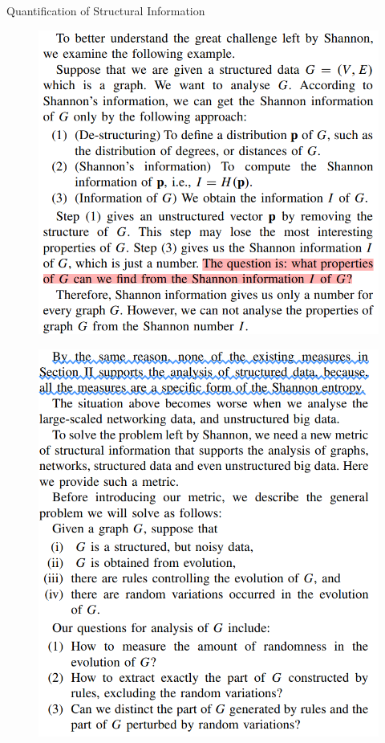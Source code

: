 \documentclass[t,aspectratio=169,usepdftitle=false]{beamer}
\begin{document}
  \begin{frame}{Quantification of Structural Information}
    \begin{minipage}[c]{0.45\linewidth}
      \begin{figure}
        \centering
        \includegraphics[width=0.9\linewidth]{./figures/FIG3.PNG}
      \end{figure}
    \end{minipage}
    \hfill
    \begin{minipage}[c]{0.45\linewidth}
      \begin{figure}
        \centering
        \includegraphics[width=0.8\linewidth]{./figures/FIG4.PNG}
      \end{figure}
    \end{minipage}
  \end{frame}
\end{document}
